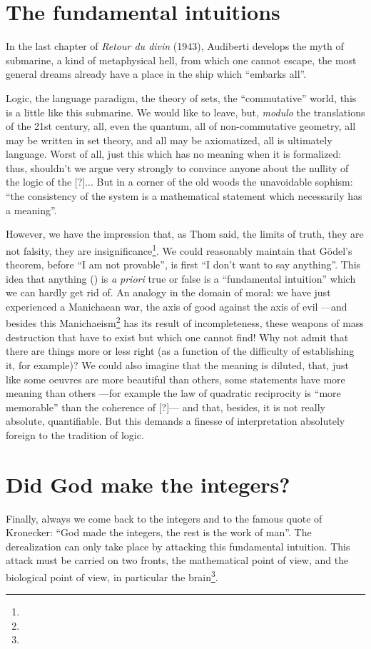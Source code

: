 \documentclass{article}
\begin{document}
\section{The fundamental intuitions}
In the last chapter of \emph{Retour du divin} (1943), Audiberti develops the myth of submarine, a kind of metaphysical hell, from which one cannot escape, the most general dreams already have a place in the ship which \enquote{embarks all}.

Logic, the language paradigm, the theory of sets, the \enquote{commutative} world, this is a little like this submarine. We would like to leave, but, \emph{modulo} the translations of the 21st century, all, even the quantum, all of non-commutative geometry, all may be written in set theory, and all may be axiomatized, all is ultimately language. Worst of all, just this which has no meaning when it is formalized: thus, shouldn't we argue very strongly to convince anyone about the nullity of the logic of the [?]... But in a corner of the old woods the unavoidable sophism: \enquote{the consistency of the system is a mathematical statement which necessarily has a meaning}.

However, we have the impression that, as Thom said, the limits of truth, they are not falsity, they are insignificance\footnote{}. We could reasonably maintain that Gödel's theorem, before \enquote{I am not provable}, is first \enquote{I don't want to say anything}. This idea that anything () is \emph{a priori} true or false is a \enquote{fundamental intuition} which we can hardly get rid of. An analogy in the domain of moral: we have just experienced a Manichaean war, the axis of good against the axis of evil ---and besides this Manichaeism\footnote{} has its result of incompleteness, these weapons of mass destruction that have to exist but which one cannot find! Why not admit that there are things more or less right (as a function of the difficulty of establishing it, for example)? We could also imagine that the meaning is diluted, that, just like some oeuvres are more beautiful than others, some statements have more meaning than others ---for example the law of quadratic reciprocity is \enquote{more memorable} than the coherence of [?]--- and that, besides, it is not really absolute, quantifiable. But this demands a finesse of interpretation absolutely foreign to the tradition of logic.

\section{Did God make the integers?}
Finally, always we come back to the integers and to the famous quote of Kronecker: \enquote{God made the integers, the rest is the work of man}. The derealization can only take place by attacking this fundamental intuition.  This attack must be carried on two fronts, the mathematical point of view, and the biological point of view, in particular the brain\footnote{}.
\end{document}
